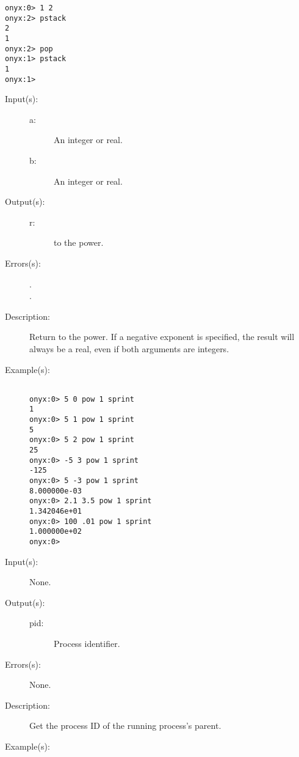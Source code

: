 \begin{description}
\begin{description}
\begin{verbatim}
onyx:0> 1 2
onyx:2> pstack
2
1
onyx:2> pop
onyx:1> pstack
1
onyx:1>
		\end{verbatim}
	\end{description}
\label{systemdict:pow}
\item[{\onyxop{a b}{pow}{r}}: ]
	\begin{description}\item[]
	\item[Input(s): ]
		\begin{description}\item[]
		\item[a: ]
			An integer or real.
		\item[b: ]
			An integer or real.
		\end{description}
	\item[Output(s): ]
		\begin{description}\item[]
		\item[r: ]
			 to the  power.
		\end{description}
	\item[Errors(s): ]
		\begin{description}\item[]
		\item[.]
		\item[.]
		\end{description}
	\item[Description: ]
		Return  to the  power.  If a negative exponent
		is specified, the result will always be a real, even if both
		arguments are integers.
	\item[Example(s): ]\begin{verbatim}

onyx:0> 5 0 pow 1 sprint
1
onyx:0> 5 1 pow 1 sprint
5
onyx:0> 5 2 pow 1 sprint
25
onyx:0> -5 3 pow 1 sprint
-125
onyx:0> 5 -3 pow 1 sprint
8.000000e-03
onyx:0> 2.1 3.5 pow 1 sprint
1.342046e+01
onyx:0> 100 .01 pow 1 sprint
1.000000e+02
onyx:0>
		\end{verbatim}
	\end{description}
\label{systemdict:ppid}
\item[{\onyxop{--}{ppid}{pid}}: ]
	\begin{description}\item[]
	\item[Input(s): ] None.
	\item[Output(s): ]
		\begin{description}\item[]
		\item[pid: ]
			Process identifier.
		\end{description}
	\item[Errors(s): ] None.
	\item[Description: ]
		Get the process ID of the running process's parent.
	\item[Example(s): ]\begin{verbatim}


\end{verbatim}
\end{description}
\end{description}
